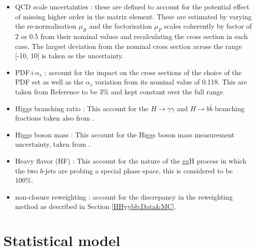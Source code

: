 \begin{itemize}
    \item QCD scale uncertainties : these are defined to account for the potential effect of missing higher order in the matrix element. These are estimated by varying the re-normalisation $\mu_R$ and the factorisation $\mu_F$ scales coherently by factor of 2 or 0.5 from their nominal values and recalculating the cross section in each case. The largest deviation from the nominal cross section across the \kl range [-10, 10] is taken as the uncertainty.  
    \item PDF+$\alpha_s$ : account for the impact on the cross sections of the choice of the PDF set as well as the $\alpha_{s}$ variation from its nominal value of 0.118. This are taken from Reference \cite{CERN_yellow} to be 3\% and kept constant over the full \kl range.
    \item Higgs branching ratio : This account for the $H\to\gamma\gamma$ and $H\to b\bar{b}$ branching fractions taken also from \cite{CERN_yellow}. 
    \item Higgs boson mass : This account for the Higgs boson mass measurement uncertainty, taken from \cite{Mass}. 
    \item Heavy flavor (HF) : This account for the nature of the ggH process in which the two $b$-jets are probing a special phase space, this is considered to be 100\%.
    \item non-closure \kl reweighting : account for the discrepancy in the \kl reweighting method as described in Section \ref{HHyybb:Data&MC}. 
\end{itemize}

\section{Statistical model}
\label{HHyybb:Stat}

